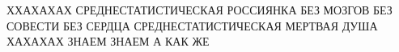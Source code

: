 

ХХАХАХАХ СРЕДНЕСТАТИСТИЧЕСКАЯ РОССИЯНКА БЕЗ МОЗГОВ БЕЗ СОВЕСТИ БЕЗ СЕРДЦА
СРЕДНЕСТАТИСТИЧЕСКАЯ МЕРТВАЯ ДУША ХАХАХАХ ЗНАЕМ ЗНАЕМ А КАК ЖЕ
















